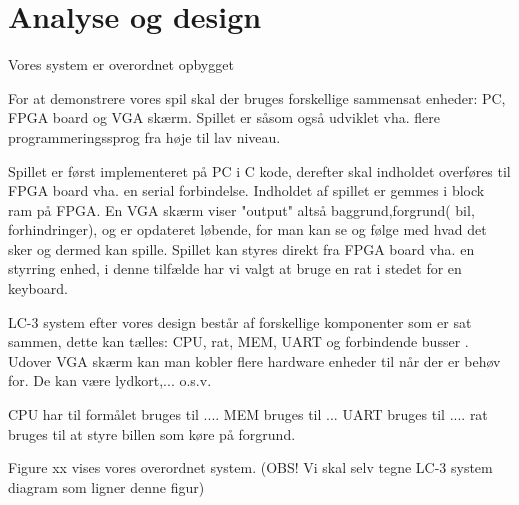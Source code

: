 \chapter{Analyse og design}\label{cha:analysedesign}
Vores system er overordnet opbygget


For at demonstrere vores spil skal der bruges forskellige sammensat enheder: PC, FPGA board og VGA skærm. Spillet er såsom også udviklet vha. flere programmeringssprog fra høje til lav niveau.

Spillet er først implementeret på PC i C kode, derefter skal indholdet overføres til FPGA board vha. en serial forbindelse. Indholdet af spillet er gemmes i block ram på FPGA. En VGA skærm viser "output" altså baggrund,forgrund( bil, forhindringer), og er opdateret løbende, for man kan se og følge med hvad det sker og dermed kan spille. Spillet kan styres direkt fra FPGA board vha. en styrring enhed, i denne tilfælde har vi valgt at bruge en rat i stedet for en keyboard.

LC-3 system efter vores design består af forskellige komponenter som er sat sammen, dette kan tælles: CPU, rat, MEM, UART og  forbindende busser . Udover VGA skærm kan man kobler flere hardware enheder til når der er behøv for. De kan være lydkort,... o.s.v.

CPU har til formålet bruges til ....
MEM bruges til ...
UART bruges til ....
rat bruges til at styre billen som køre på forgrund.

Figure xx vises vores overordnet system.
(OBS! Vi skal selv tegne LC-3 system diagram som ligner denne figur)